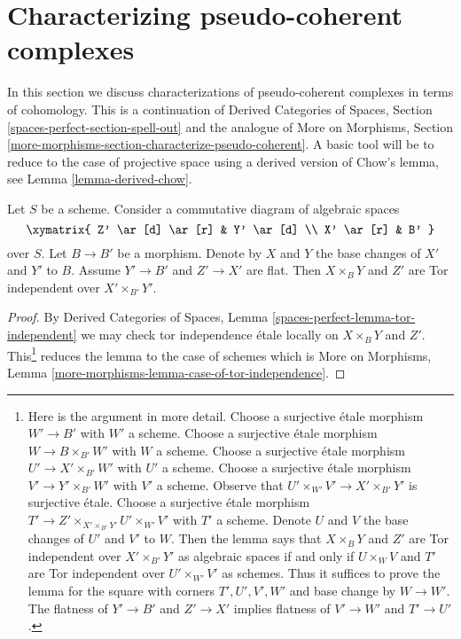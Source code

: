 \section{Characterizing pseudo-coherent complexes}
\label{section-characterize-pseudo-coherent}

\noindent
In this section we discuss characterizations of pseudo-coherent complexes
in terms of cohomology. This is a continuation of
Derived Categories of Spaces, Section
\ref{spaces-perfect-section-spell-out}
and the analogue of More on Morphisms, Section
\ref{more-morphisms-section-characterize-pseudo-coherent}.
A basic tool will be to reduce to the case of projective space
using a derived version of Chow's lemma, see
Lemma \ref{lemma-derived-chow}.

\begin{lemma}
\label{lemma-case-of-tor-independence}
Let $S$ be a scheme. Consider a commutative diagram of algebraic spaces
$$
\xymatrix{
Z' \ar[d] \ar[r] & Y' \ar[d] \\
X' \ar[r] & B'
}
$$
over $S$.
Let $B \to B'$ be a morphism. Denote by $X$ and $Y$ the base
changes of $X'$ and $Y'$ to $B$.
Assume $Y' \to B'$ and $Z' \to X'$ are flat.
Then $X \times_B Y$ and $Z'$ are Tor independent over $X' \times_{B'} Y'$.
\end{lemma}

\begin{proof}
By Derived Categories of Spaces, Lemma
\ref{spaces-perfect-lemma-tor-independent}
we may check tor independence \'etale locally on $X \times_B Y$
and $Z'$. This\footnote{Here is the argument in more detail.
Choose a surjective \'etale morphism $W' \to B'$
with $W'$ a scheme. Choose a surjective \'etale morphism
$W \to B \times_{B'} W'$ with $W$ a scheme. Choose a
surjective \'etale morphism
$U' \to X' \times_{B'} W'$ with $U'$ a scheme. Choose a
surjective \'etale morphism $V' \to Y' \times_{B'} W'$ with $V'$ a scheme.
Observe that $U' \times_{W'} V' \to X' \times_{B'} Y'$ is surjective
\'etale. Choose a surjective \'etale morphism
$T' \to Z' \times_{X' \times_{B'} Y'} U' \times_{W'} V'$
with $T'$ a scheme. Denote $U$ and $V$ the base changes of $U'$ and $V'$
to $W$. Then the lemma says that $X \times_B Y$ and $Z'$
are Tor independent over $X' \times_{B'} Y'$ as algebraic spaces
if and only if $U \times_W V$ and $T'$ are Tor independent over
$U' \times_{W'} V'$ as schemes. Thus
it suffices to prove the lemma for
the square with corners $T', U', V', W'$ and base change by $W \to W'$.
The flatness of $Y' \to B'$ and $Z' \to X'$ implies flatness
of $V' \to W'$ and $T' \to U'$.}
reduces the lemma to the case of schemes
which is More on Morphisms, Lemma
\ref{more-morphisms-lemma-case-of-tor-independence}.
\end{proof}

